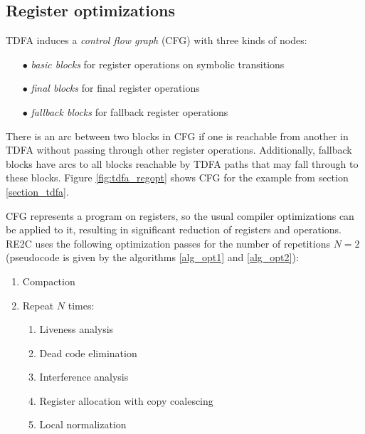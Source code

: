\documentclass[]{article}
\begin{document}
\subsection{Register optimizations}

TDFA induces a \emph{control flow graph} (CFG) with three kinds of nodes:
\medskip

\begin{itemize}
\item[$\bullet$] \emph{basic blocks} for register operations on symbolic transitions
\item[$\bullet$] \emph{final blocks} for final register operations
\item[$\bullet$] \emph{fallback blocks} for fallback register operations
\end{itemize}
\medskip

There is an arc between two blocks in CFG if one is reachable from another in TDFA without passing through other register operations.
Additionally, fallback blocks have arcs to all blocks reachable by TDFA paths that may fall through to these blocks.
Figure \ref{fig:tdfa_regopt} shows CFG for the example from section \ref{section_tdfa}.
\medskip

CFG represents a program on registers, so the usual compiler optimizations can be applied to it,
resulting in significant reduction of registers and operations.
RE2C uses the following optimization passes for the number of repetitions $N=2$
(pseudocode is given by the algorithms \ref{alg_opt1} and \ref{alg_opt2}):
\medskip

\begin{enumerate}
    \item Compaction
    \item Repeat $N$ times:
    \begin{enumerate}[label=\alph*.]
        \item Liveness analysis
        \item Dead code elimination
        \item Interference analysis
        \item Register allocation with copy coalescing
        \item Local normalization
    \end{enumerate}
\end{enumerate}
\medskip

\end{document}
